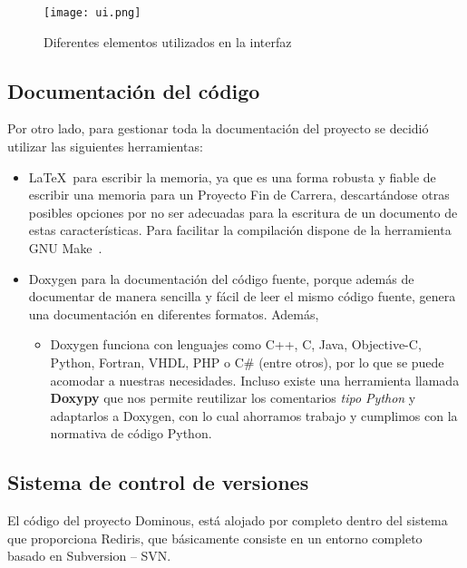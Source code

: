 \begin{figure}[h]
  \label{interfaz}
  \begin{center}
    \texttt{[image: ui.png]}
  \end{center}
  \caption{Diferentes elementos utilizados en la interfaz}
\end{figure}

\subsection{Documentación del código}

Por otro lado, para gestionar toda la documentación del proyecto se decidió utilizar las siguientes herramientas:
\begin{itemize}
    \item \LaTeX\ para escribir la memoria, ya que es una forma robusta y fiable de escribir una memoria para
            un Proyecto Fin de Carrera, descartándose otras posibles opciones por no ser adecuadas para la escritura
            de un documento de estas características. Para facilitar la compilación dispone de la herramienta
            GNU Make~\cite{pdf:make}.
    \item Doxygen para la documentación del código fuente, porque además de documentar de manera sencilla y fácil
            de leer el mismo código fuente, genera una documentación en diferentes formatos. Además,
        \begin{itemize}
            \item Doxygen funciona con lenguajes como C++, C, Java, Objective-C, Python, Fortran, VHDL, PHP o C\#
                    (entre otros), por lo que se puede acomodar a nuestras necesidades. Incluso existe una
                    herramienta llamada \textbf{Doxypy} que nos permite reutilizar los comentarios \emph{tipo Python}
                    y adaptarlos a Doxygen, con lo cual ahorramos trabajo y cumplimos con la normativa
                    de código Python.
        \end{itemize}
\end{itemize}

\subsection{Sistema de control de versiones}

El código del proyecto Dominous, está alojado por completo dentro del sistema que proporciona Rediris, que básicamente
consiste en un entorno completo basado en Subversion -- SVN. \\ 

